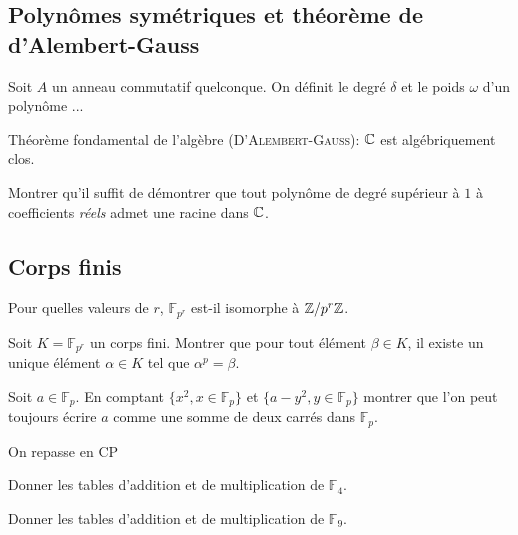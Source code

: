 \documentclass[french]{report}
\begin{document}
\subsection*{Polynômes symétriques et théorème de d'Alembert-Gauss}

\begin{exo}
    Soit \(A\) un anneau commutatif quelconque. On définit le degré \(\delta\) et le
    poids \(\omega\) d'un polynôme ...
\end{exo}

\begin{exo}
    Théorème fondamental de l'algèbre (\textsc{D'Alembert-Gauss}): \(\mathbb{C}\) est
    algébriquement clos.
    \begin{q}{1}
        Montrer qu'il suffit de démontrer que tout polynôme de degré supérieur à \(1\)
        à coefficients \textit{réels} admet une racine dans \(\mathbb{C}\).
    \end{q}
\end{exo}

\subsection*{Corps finis}

\begin{exo}
    Pour quelles valeurs de \(r\), \(\mathbb{F}_{p^r}\) est-il isomorphe à \(\mathbb{Z}/p^r\mathbb{Z}\).
\end{exo}

\begin{exo}
    Soit \(K=\mathbb{F}_{p^r}\) un corps fini. Montrer que pour tout élément \(\beta\in K\),
    il existe un unique élément \(\alpha\in K\) tel que \(\alpha^p=\beta\).
\end{exo}

\begin{exo}
    Soit \(a\in\mathbb{F}_p\). En comptant \(\{x^2,x\in\mathbb{F}_p\}\) et
    \(\{a-y^2,y\in\mathbb{F}_p\}\) montrer que l'on peut toujours écrire \(a\) comme
    une somme de deux carrés dans \(\mathbb{F}_p\).
\end{exo}

\begin{exo}
    On repasse en CP
    \begin{q}{1}
        Donner les tables d'addition et de multiplication de \(\mathbb{F}_4\).
    \end{q}
    \begin{q}{2}
        Donner les tables d'addition et de multiplication de \(\mathbb{F}_9\).
    \end{q}
\end{exo}
\end{document}
